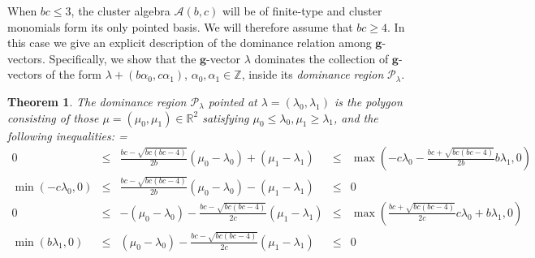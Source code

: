 \documentclass{amsart}
\newtheorem{theorem}{Theorem}
\numberwithin{theorem}{section}
\newcommand{\bfg}{\boldsymbol{g}}
\newcommand{\cA}{\mathcal{A}}
\newcommand{\cP}{\mathcal{P}}
\newcommand{\RR}{\mathbb{R}}
\newcommand{\ZZ}{\mathbb{Z}}
\begin{document}
  When $bc\le3$, the cluster algebra $\cA(b,c)$ will be of finite-type and cluster monomials form its only pointed basis.
  We will therefore assume that $bc\ge4$.
  In this case we give an explicit description of the dominance relation among $\bfg$-vectors.
  Specifically, we show that the $\bfg$-vector $\lambda$ dominates the collection of $\bfg$-vectors of the form $\lambda+(b \alpha_0 ,c \alpha_1)$, $\alpha_0,\alpha_1\in\ZZ$, inside its \emph{dominance region} $\cP_\lambda$.
  \begin{theorem}
    \label{th:dominance inequalities}
    The dominance region $\cP_\lambda$ pointed at $\lambda=(\lambda_0,\lambda_1)$ is the polygon consisting of those $\mu=(\mu_0,\mu_1)\in\RR^2$ satisfying $\mu_0 \leq \lambda_0, \mu_1 \geq\lambda_1$, and the following inequalities:
    {
      \everymath={\displaystyle}
      \def\arraystretch{2.8}
      \[
        \begin{array}{rcccl}
          0 & \leq & \frac{b c-\sqrt{b c (b c-4)}}{2 b}(\mu_0-\lambda_0)+(\mu_1-\lambda_1) & \leq & \max\left(-c\lambda_0-\frac{b c+\sqrt{b c (b c-4)}}{2b}b\lambda_1,0\right)
          \\
          \min\left(-c\lambda_0,0\right) & \leq & \frac{b c-\sqrt{b c (b c-4)}}{2 b}(\mu_0-\lambda_0)-(\mu_1-\lambda_1) & \leq & 0
          \\
          0 & \leq &  -(\mu_0-\lambda_0)-\frac{b c-\sqrt{b c (b c-4)}}{2 c}(\mu_1-\lambda_1) & \leq & \max\left(\frac{b c+\sqrt{b c (b c-4)}}{2c}c\lambda_0+b\lambda_1,0\right)
          \\
          \min\left(b \lambda_1,0\right) & \leq & (\mu_0-\lambda_0) - \frac{b c-\sqrt{b c (b c-4)}}{2 c} (\mu_1-\lambda_1) & \leq & 0
        \end{array}
      \]
    }
    
  \end{theorem}
\end{document}
